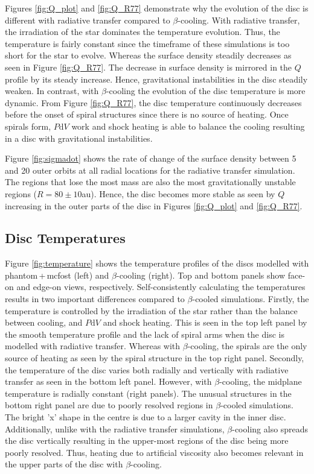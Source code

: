 \documentclass[usenatbib]{mnras}
\begin{document}
Figures \ref{fig:Q_plot} and \ref{fig:Q_R77} demonstrate why the evolution of the disc is different with radiative transfer compared to $\beta$-cooling.
With radiative transfer, the irradiation of the star dominates the temperature evolution. Thus, the temperature is fairly constant since the timeframe of these simulations is too short for the star to evolve. 
Whereas the surface density steadily decreases as seen in Figure \ref{fig:Q_R77}. The decrease in surface density is mirrored in the $Q$ profile by its steady increase. Hence, gravitational instabilities in the disc steadily weaken. In contrast, with $\beta$-cooling the evolution of the disc temperature is more dynamic.  From Figure \ref{fig:Q_R77}, the disc temperature continuously decreases before the onset of spiral structures since there is no source of heating. Once spirals form, $P\mathrm{d}V$ work and shock heating is able to balance the cooling resulting in a disc with gravitational instabilities.

Figure \ref{fig:sigmadot} shows the rate of change of the surface density between 5 and 20 outer orbits at all radial locations for the radiative transfer simulation. The regions that lose the most mass are also the most gravitationally unstable regions (${R = 80\pm10}$au). Hence, the disc becomes more stable as seen by $Q$ increasing in the outer parts of the disc in Figures \ref{fig:Q_plot} and \ref{fig:Q_R77}.

\subsection{Disc Temperatures} 

Figure \ref{fig:temperature} shows the temperature profiles of the discs modelled with {\sc phantom\,+\,mcfost} (left) and $\beta$-cooling (right). Top and bottom panels show face-on and edge-on views, respectively. Self-consistently calculating the temperatures results in two important differences compared to $\beta$-cooled simulations. Firstly, the temperature is controlled by the irradiation of the star rather than the balance between cooling, and $P\mathrm{d}V$ and shock heating. This is seen in the top left panel by the smooth temperature profile and the lack of spiral arms when the disc is modelled with radiative transfer. Whereas with $\beta$-cooling, the spirals are the only source of heating as seen by the spiral structure in the top right panel. Secondly, the temperature of the disc varies both radially and vertically with radiative transfer as seen in the bottom left panel. However, with $\beta$-cooling, the midplane temperature is radially constant (right panels). The unusual structures in the bottom right panel are due to poorly resolved regions in $\beta$-cooled simulations. The bright 'x' shape in the centre is due to a larger cavity in the inner disc. Additionally, unlike with the radiative transfer simulations, $\beta$-cooling also spreads the disc vertically resulting in the upper-most regions of the disc being more poorly resolved. Thus, heating due to artificial viscosity also becomes relevant in the upper parts of the disc with $\beta$-cooling.
\end{document}
